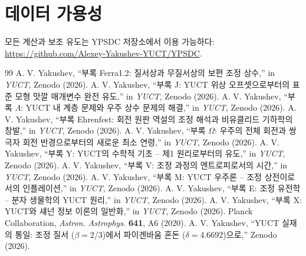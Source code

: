 \documentclass[12pt,a4paper]{article}
\begin{document}
	\section*{데이터 가용성}
	모든 계산과 보조 유도는 YPSDC 저장소에서 이용 가능하다: \url{https://github.com/Alexey-Yakushev-YUCT/YPSDC}.
	
	\begin{thebibliography}{99}
		 A. V. Yakushev, ``부록 Ferra1.2: 질서상과 무질서상의 보편 조정 상수,'' in \emph{YUCT}, Zenodo (2026).
		 A. V. Yakushev, ``부록 J: YUCT 위상 오프셋으로부터의 표준 모형 맛깔 매개변수 완전 유도,'' in \emph{YUCT}, Zenodo (2026).
		 A. V. Yakushev, ``부록 \(\Lambda\): YUCT 내 계층 문제와 우주 상수 문제의 해결,'' in \emph{YUCT}, Zenodo (2026).
		 A. V. Yakushev, ``부록 Ehrenfest: 회전 원판 역설의 조정 해석과 비유클리드 기하학의 창발,'' in \emph{YUCT}, Zenodo (2026).
		 A. V. Yakushev, ``부록 \(\Omega\): 우주의 전체 회전과 쌍극자 회전 반경으로부터의 새로운 최소 연령,'' in \emph{YUCT}, Zenodo (2026).
		 A. V. Yakushev, ``부록 Y: YUCT의 수학적 기초 – 제1 원리로부터의 유도,'' in \emph{YUCT}, Zenodo (2026).
		 A. V. Yakushev, ``부록 V: 조정 과정의 엔트로피로서의 시간,'' in \emph{YUCT}, Zenodo (2026).
		 A. V. Yakushev, ``부록 M: YUCT 우주론 – 조정 상전이로서의 인플레이션,'' in \emph{YUCT}, Zenodo (2026).
		 A. V. Yakushev, ``부록 E: 조정 유전학 – 분자 생물학의 YUCT 원리,'' in \emph{YUCT}, Zenodo (2026).
		 A. V. Yakushev, ``부록 X: YUCT와 섀넌 정보 이론의 일반화,'' in \emph{YUCT}, Zenodo (2026).
		 Planck Collaboration, \emph{Astron. Astrophys.} \textbf{641}, A6 (2020).
		 A. V. Yakushev, ``YUCT 실재의 통일: 조정 질서 (\(\beta = 2/3\))에서 파이겐바움 혼돈 (\(\delta = 4.6692\))으로,'' Zenodo (2026).
	\end{thebibliography}
	
\end{document}
